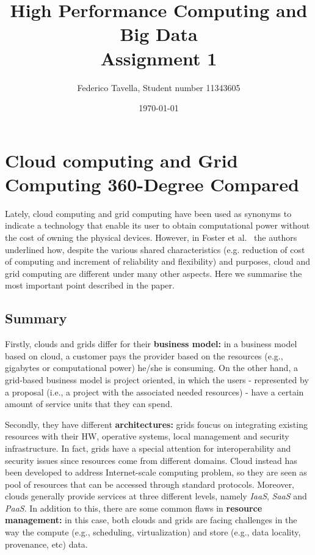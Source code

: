 \documentclass[a4paper]{IEEEtran}
\title{High Performance Computing and Big Data \\ Assignment 1}
\author{Federico Tavella, Student number 11343605}
\date{\today}
\begin{document}
\maketitle

\section{Cloud computing and Grid Computing 360-Degree Compared}

Lately, cloud computing and grid computing have been used as synonyms to indicate a technology that enable its user to obtain computational power without the cost of owning the physical devices. However, in Foster et al.~\cite{CloudGrid} the authors underlined how, despite the various shared characteristics (e.g. reduction of cost of computing and increment of reliability and flexibility) and purposes, cloud and grid computing are different under many other aspects. Here we summarise the most important point described in the paper. 

\subsection{Summary}

Firstly, clouds and grids differ for their \textbf{business model:} in a business model based on cloud, a customer pays the provider based on the resources (e.g., gigabytes or computational power) he/she is consuming. On the other hand, a grid-based business model is project oriented, in which the users - represented by a proposal (i.e., a project with the associated needed resources) - have a certain amount of service units that they can spend.

Secondly, they have different \textbf{architectures:} grids foucus on integrating existing resources with their HW, operative systems, local management and security infrastructure. In fact, grids have a special attention for interoperability and security issues since resources come from different domains. Cloud instead has been developed to address Internet-scale computing problem, so they are seen as pool of resources that can be accessed through standard protocols. Moreover, clouds generally provide services at three different levels, namely \textit{IaaS}, \textit{SaaS} and \textit{PaaS}.
In addition to this, there are some common flaws in \textbf{resource management:} in this case, both clouds and grids are facing challenges in the way the compute (e.g., scheduling, virtualization) and store (e.g., data locality, provenance, etc) data.
\end{document}
